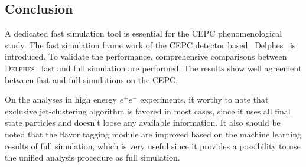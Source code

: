 \documentclass[a4paper,10pt,twoside]{cpc-hepnp}
\begin{document}
\begin{multicols}{2}
\section{Conclusion\label{sec:conclusion}}
A dedicated fast simulation tool is essential for the CEPC phenomenological study.
The fast simulation  frame work of the CEPC detector based {~\textsf{Delphes}~} is introduced. 
To validate the performance, comprehensive comparisons between {\textsc{Delphes}~} fast and full simulation are performed.
The results show  well agreement between fast and full simulations on the CEPC.

On the analyses in high energy $e^+e^-$ experiments, it worthy to note that exclusive jet-clustering algorithm is favored in most cases,
since it uses all final state particles and doesn't loose any available information. 
It also should be noted that the flavor tagging module are improved based on the machine learning results of full simulation, 
which is very useful since it provides a possibility to use the unified analysis procedure as full simulation.
\vspace{3mm}

\begin{thebibliography}{90}

\vspace{3mm}


\end{thebibliography}
\end{multicols}
\end{document}
